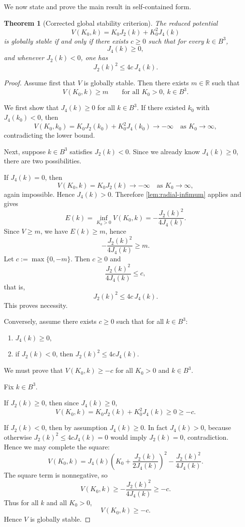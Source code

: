 \documentclass[11pt,a4paper]{article}
\theoremstyle{plain}
\newtheorem{theorem}{Theorem}[section]
\theoremstyle{definition}
\theoremstyle{remark}
\newcommand{\R}{\mathbb{R}}
\begin{document}
We now state and prove the main result in self-contained form.

\begin{theorem}[Corrected global stability criterion]\label{thm:main}
The reduced potential
\[
V(K_0,k)=K_0J_2(k)+K_0^2J_4(k)
\]
is globally stable if and only if there exists $c\ge 0$ such that for every $k\in B^3$,
\[
J_4(k)\ge 0,
\]
and whenever $J_2(k)<0$, one has
\[
J_2(k)^2\le 4c\,J_4(k).
\]
\end{theorem}

\begin{proof}
Assume first that $V$ is globally stable. Then there exists $m\in\R$ such that
\[
V(K_0,k)\ge m
\qquad\text{for all }K_0>0,\ k\in B^3.
\]

We first show that $J_4(k)\ge 0$ for all $k\in B^3$. If there existed $k_0$ with $J_4(k_0)<0$, then
\[
V(K_0,k_0)=K_0J_2(k_0)+K_0^2J_4(k_0)\to -\infty
\quad\text{as }K_0\to\infty,
\]
contradicting the lower bound.

Next, suppose $k\in B^3$ satisfies $J_2(k)<0$. Since we already know $J_4(k)\ge 0$, there are two possibilities.

If $J_4(k)=0$, then
\[
V(K_0,k)=K_0J_2(k)\to -\infty
\quad\text{as }K_0\to\infty,
\]
again impossible. Hence $J_4(k)>0$. Therefore \cref{lem:radial-infimum} applies and gives
\[
E(k)=\inf_{K_0>0}V(K_0,k)=-\frac{J_2(k)^2}{4J_4(k)}.
\]
Since $V\ge m$, we have $E(k)\ge m$, hence
\[
-\frac{J_2(k)^2}{4J_4(k)}\ge m.
\]
Let $c:=\max\{0,-m\}$. Then $c\ge 0$ and
\[
\frac{J_2(k)^2}{4J_4(k)}\le c,
\]
that is,
\[
J_2(k)^2\le 4c\,J_4(k).
\]
This proves necessity.

Conversely, assume there exists $c\ge 0$ such that for all $k\in B^3$:
\begin{enumerate}[label=(\roman*),leftmargin=2em]
\item $J_4(k)\ge 0$,
\item if $J_2(k)<0$, then $J_2(k)^2\le 4cJ_4(k)$.
\end{enumerate}
We must prove that $V(K_0,k)\ge -c$ for all $K_0>0$ and $k\in B^3$.

Fix $k\in B^3$.

If $J_2(k)\ge 0$, then since $J_4(k)\ge 0$,
\[
V(K_0,k)=K_0J_2(k)+K_0^2J_4(k)\ge 0\ge -c.
\]

If $J_2(k)<0$, then by assumption $J_4(k)\ge 0$. In fact $J_4(k)>0$, because otherwise $J_2(k)^2\le 4cJ_4(k)=0$ would imply $J_2(k)=0$, contradiction. Hence we may complete the square:
\[
V(K_0,k)
=
J_4(k)\left(K_0+\frac{J_2(k)}{2J_4(k)}\right)^2
-\frac{J_2(k)^2}{4J_4(k)}.
\]
The square term is nonnegative, so
\[
V(K_0,k)\ge -\frac{J_2(k)^2}{4J_4(k)}\ge -c.
\]
Thus for all $k$ and all $K_0>0$,
\[
V(K_0,k)\ge -c.
\]
Hence $V$ is globally stable.
\end{proof}
\end{document}
